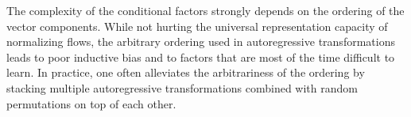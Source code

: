 The complexity of the conditional factors  strongly depends on the ordering of the vector components. While not hurting the universal representation capacity of normalizing flows, the arbitrary ordering used in autoregressive transformations leads to poor inductive bias and to factors that are most of the time difficult to learn.
In practice, one often alleviates the arbitrariness of the ordering by stacking multiple autoregressive transformations combined with random permutations on top of each other. %

%
